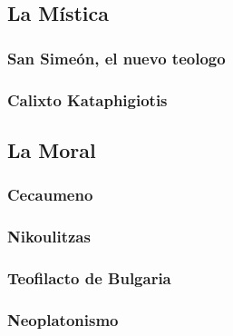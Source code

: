 \subsection{La Mística}
	\subsubsection{San Simeón, el nuevo teologo}
	\subsubsection{Calixto Kataphigiotis}
\subsection{La Moral}
	\subsubsection{Cecaumeno}
	\subsubsection{Nikoulitzas}
	\subsubsection{Teofilacto de Bulgaria}
	\subsubsection{Neoplatonismo}

